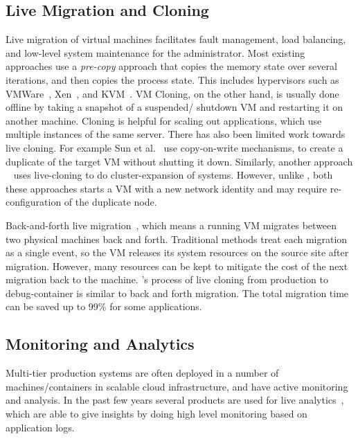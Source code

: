\subsection{Live Migration and Cloning}
Live migration of virtual machines facilitates fault management, load balancing, and low-level system maintenance for the administrator.
Most existing approaches use a \textit{pre-copy} approach that copies the memory state over several iterations, and then copies the process state.
This includes hypervisors such as VMWare~\cite{nelson2005fast}, Xen~\cite{clark2005live}, and KVM~\cite{kivity2007kvm}.
VM Cloning, on the other hand, is usually done offline by taking a snapshot of a suspended/ shutdown VM and restarting it on another machine.
Cloning is helpful for scaling out applications, which use multiple instances of the same server.
There has also been limited work towards live cloning. 
For example Sun et al.~\cite{Sun:2009:FLC:1581383.1582148} use copy-on-write mechanisms, to create a duplicate of the target VM without shutting it down.
Similarly, another approach ~\cite{gebhart2009dynamic} uses live-cloning to do cluster-expansion of systems.
However, unlike \parikshan, both these approaches starts a VM with a new network identity and may require re-configuration of the duplicate node.

Back-and-forth live migration~\cite{backforth}, which means a running VM migrates between two physical machines back and forth. Traditional methods treat each migration as a single event, so the VM releases its system resources on the source site after migration. However, many resources can be kept to mitigate the cost of the next migration back to the machine. \parikshan's process of live cloning from production to debug-container is similar to back and forth migration. The total migration time can be saved up to 99\% for some applications.

\subsection{Monitoring and Analytics}

Multi-tier production systems are often deployed in a number of machines/containers in scalable cloud infrastructure, and have active monitoring and analysis.
In the past few years several products are used for live analytics~\cite{nagios,magpie,vpath}, which are able to give insights by doing high level monitoring based on application logs.

